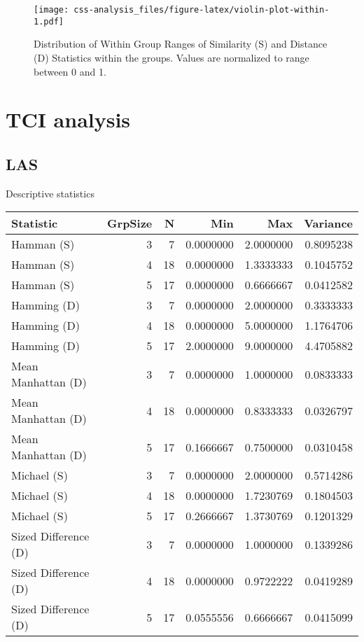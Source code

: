 \documentclass[]{article}
\begin{document}
\begin{figure}
\centering
\texttt{[image: css-analysis\_files/figure-latex/violin-plot-within-1.pdf]}
\caption{Distribution of Within Group Ranges of Similarity (S) and
Distance (D) Statistics within the groups. Values are normalized to
range between 0 and 1.}
\end{figure}

\hypertarget{tci-analysis}{%
\section{TCI analysis}\label{tci-analysis}}

\hypertarget{las}{%
\subsection{LAS}\label{las}}

Descriptive statistics

\begin{longtable}[]{@{}lrrrrr@{}}
\toprule
Statistic & GrpSize & N & Min & Max & Variance\tabularnewline
\midrule
\endhead
Hamman (S) & 3 & 7 & 0.0000000 & 2.0000000 & 0.8095238\tabularnewline
Hamman (S) & 4 & 18 & 0.0000000 & 1.3333333 & 0.1045752\tabularnewline
Hamman (S) & 5 & 17 & 0.0000000 & 0.6666667 & 0.0412582\tabularnewline
Hamming (D) & 3 & 7 & 0.0000000 & 2.0000000 & 0.3333333\tabularnewline
Hamming (D) & 4 & 18 & 0.0000000 & 5.0000000 & 1.1764706\tabularnewline
Hamming (D) & 5 & 17 & 2.0000000 & 9.0000000 & 4.4705882\tabularnewline
Mean Manhattan (D) & 3 & 7 & 0.0000000 & 1.0000000 &
0.0833333\tabularnewline
Mean Manhattan (D) & 4 & 18 & 0.0000000 & 0.8333333 &
0.0326797\tabularnewline
Mean Manhattan (D) & 5 & 17 & 0.1666667 & 0.7500000 &
0.0310458\tabularnewline
Michael (S) & 3 & 7 & 0.0000000 & 2.0000000 & 0.5714286\tabularnewline
Michael (S) & 4 & 18 & 0.0000000 & 1.7230769 & 0.1804503\tabularnewline
Michael (S) & 5 & 17 & 0.2666667 & 1.3730769 & 0.1201329\tabularnewline
Sized Difference (D) & 3 & 7 & 0.0000000 & 1.0000000 &
0.1339286\tabularnewline
Sized Difference (D) & 4 & 18 & 0.0000000 & 0.9722222 &
0.0419289\tabularnewline
Sized Difference (D) & 5 & 17 & 0.0555556 & 0.6666667 &
0.0415099\tabularnewline
\bottomrule
\end{longtable}

\clearpage
\end{document}
